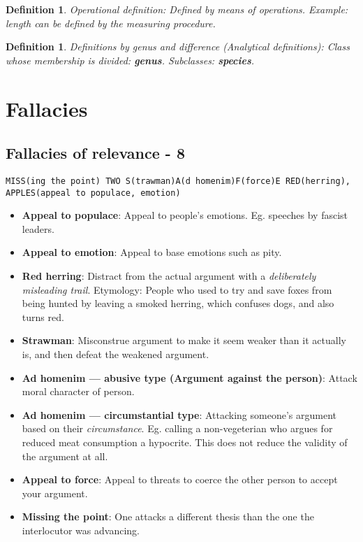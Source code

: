 \documentclass[5pt]{book}
\newtheorem{definition}[theorem]{Definition}
\begin{document}
\begin{definition}Operational definition: Defined by means of operations.
    Example: length can be defined by the measuring procedure.
\end{definition}

\begin{definition}Definitions by genus and difference (Analytical definitions):
    Class whose membership is divided: \textbf{genus}. Subclasses: \textbf{species}.
\end{definition}

\section{Fallacies}
\subsection{Fallacies of relevance - 8} 
\texttt{MISS(ing the point) TWO S(trawman)A(d homenim)F(force)E RED(herring), APPLES(appeal to populace, emotion)}
\begin{itemize}
    \item \textbf{Appeal to populace}: Appeal to people's emotions. Eg. speeches
        by fascist leaders.
    \item \textbf{Appeal to emotion}: Appeal to base emotions such as pity.
    \item \textbf{Red herring}: Distract from the actual argument with a
        \textit{deliberately misleading trail}. Etymology: People who used to
        try and save foxes from being hunted by leaving a smoked herring, which
        confuses dogs, and also turns red.
    \item \textbf{Strawman}: Misconstrue argument to make it seem weaker
        than it actually is, and then defeat the weakened argument.
    \item \textbf{Ad homenim --- abusive type (Argument against the person)}: Attack moral character
        of person. 
    \item \textbf{Ad homenim --- circumstantial type}: Attacking someone's argument
        based on their \textit{circumstance}. Eg. calling a non-vegeterian who
        argues for reduced meat consumption a hypocrite. This does not reduce the
        validity of the argument at all.
    \item \textbf{Appeal to force}: Appeal to threats to coerce the other
        person to accept your argument.
    \item \textbf{Missing the point}: One attacks a different thesis than
        the one the interlocutor was advancing.

\end{itemize}
\end{document}
